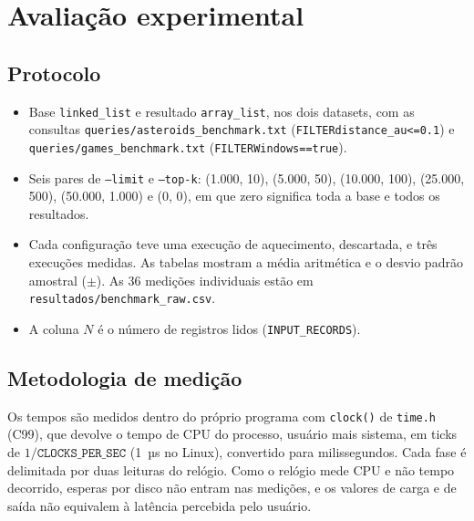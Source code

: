 \documentclass[11pt,a4paper]{article}
\begin{document}
\section{Avaliação experimental}

\subsection{Protocolo}

\begin{itemize}[nosep]
  \item Base \texttt{linked\_\allowbreak{}list} e resultado \texttt{array\_\allowbreak{}list}, nos dois datasets, com as consultas \texttt{queries/\allowbreak{}asteroids\_\allowbreak{}benchmark.txt} (\texttt{FILTER\textbar{}\allowbreak{}distance\_\allowbreak{}au\textbar{}\allowbreak{}<=\textbar{}\allowbreak{}0.1}) e \texttt{queries/\allowbreak{}games\_\allowbreak{}benchmark.txt} (\texttt{FILTER\textbar{}\allowbreak{}Windows\textbar{}\allowbreak{}==\textbar{}\allowbreak{}true}).
  \item Seis pares de \texttt{--limit} e \texttt{--top-k}: (1.000, 10), (5.000, 50), (10.000, 100), (25.000, 500), (50.000, 1.000) e (0, 0), em que zero significa toda a base e todos os resultados.
  \item Cada configuração teve uma execução de aquecimento, descartada, e três execuções medidas. As tabelas mostram a média aritmética e o desvio padrão amostral ($\pm$). As 36 medições individuais estão em \texttt{resultados/\allowbreak{}benchmark\_\allowbreak{}raw.csv}.
  \item A coluna $N$ é o número de registros lidos (\texttt{INPUT\_\allowbreak{}RECORDS}).
\end{itemize}

\subsection{Metodologia de medição}\label{sec:met}

Os tempos são medidos dentro do próprio programa com \texttt{clock()} de \texttt{time.h} (C99), que devolve o tempo de CPU do processo, usuário mais sistema, em ticks de $1/\texttt{CLOCKS\_PER\_SEC}$ (1~µs no Linux), convertido para milissegundos. Cada fase é delimitada por duas leituras do relógio. Como o relógio mede CPU e não tempo decorrido, esperas por disco não entram nas medições, e os valores de carga e de saída não equivalem à latência percebida pelo usuário.
\end{document}
